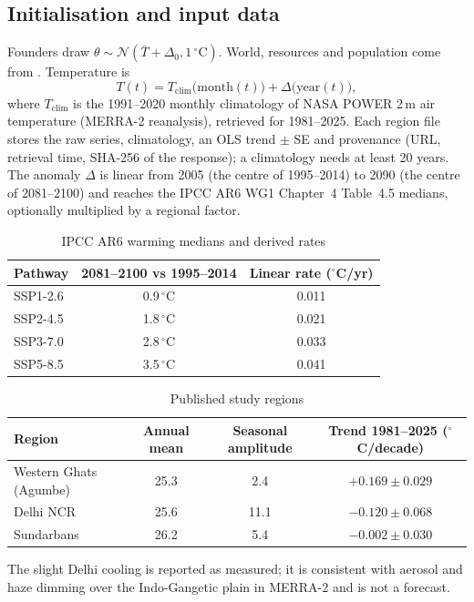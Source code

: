 \subsection{Initialisation and input data}
Founders draw $\theta\sim\mathcal{N}(\bar T+\Delta_0,1\,^{\circ}\mathrm{C})$. World,
resources and population come from . Temperature is
\[
T(t)=T_{\text{clim}}\big(\text{month}(t)\big)+\Delta\big(\text{year}(t)\big),
\]
where $T_{\text{clim}}$ is the 1991--2020 monthly climatology of NASA POWER 2\,m
air temperature (MERRA-2 reanalysis), retrieved for 1981--2025. Each region file
stores the raw series, climatology, an OLS trend $\pm$ SE and provenance (URL,
retrieval time, SHA-256 of the response); a climatology needs at least 20 years.
The anomaly $\Delta$ is linear from 2005 (the centre of 1995--2014) to 2090 (the
centre of 2081--2100) and reaches the IPCC AR6 WG1 Chapter~4 Table~4.5 medians,
optionally multiplied by a regional factor.

\begin{table}[htbp]
\centering
\caption{IPCC AR6 warming medians and derived rates}
\begin{tabular}{lcc}
\toprule
Pathway & 2081--2100 vs 1995--2014 & Linear rate ($^{\circ}$C/yr) \\
\midrule
SSP1-2.6 & 0.9\,$^{\circ}$C & 0.011 \\
SSP2-4.5 & 1.8\,$^{\circ}$C & 0.021 \\
SSP3-7.0 & 2.8\,$^{\circ}$C & 0.033 \\
SSP5-8.5 & 3.5\,$^{\circ}$C & 0.041 \\
\bottomrule
\end{tabular}
\end{table}

\begin{table}[htbp]
\centering
\caption{Published study regions}
\begin{tabular}{lccc}
\toprule
Region & Annual mean & Seasonal amplitude & Trend 1981--2025 ($^{\circ}$C/decade) \\
\midrule
Western Ghats (Agumbe) & 25.3 & 2.4 & $+0.169\pm0.029$ \\
Delhi NCR & 25.6 & 11.1 & $-0.120\pm0.068$ \\
Sundarbans & 26.2 & 5.4 & $-0.002\pm0.030$ \\
\bottomrule
\end{tabular}
\end{table}
The slight Delhi cooling is reported as measured; it is consistent with aerosol
and haze dimming over the Indo-Gangetic plain in MERRA-2 and is not a forecast.

